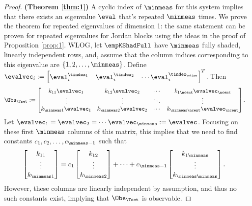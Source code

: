 \begin{proof}
\textbf{(Theorem \ref{thm:1})}
A cyclic index of $\minmeas$ for this system implies that there exists an eigenvalue $\eval$ that's repeated $\minmeas$ times. We prove the theorem for repeated eigenvalues of dimension 1: the same statement can be proven for repeated eigenvalues for Jordan blocks using the ideas in the proof of Proposition \ref{prop:1}. 
WLOG, let $\empKShadFull$ have $\minmeas$ fully shaded, linearly independent rows, and, assume that the column indices corresponding to this eigenvalue are $\{1,2,\dots,\minmeas\}$. Define 
$\evalvec_i:= \begin{bmatrix}\eval_i^{\tindex_1} & \eval_i^{\tindex_2} & \cdots \eval_i^{\tindex_{\otime}}\end{bmatrix}^T$. Then
	\begin{align*}
	\Obs_{\Tset}
	&:= 
	\begin{bmatrix}
	k_{11} \evalvec_1 & k_{12} \evalvec_2 & \cdots & k_{1\ncent} \evalvec_{\ncent}\\
	\vdots & \vdots & \ddots & \vdots\\
	k_{\minmeas 1} \evalvec_1 & k_{\minmeas 2} \evalvec_2 & \cdots & k_{\minmeas \ncent} \evalvec_{\ncent}
	\end{bmatrix}.
	\end{align*}
	Let $\evalvec_1 = \evalvec_2 = \cdots \evalvec_{\minmeas} := \evalvec$. 
	Focusing on these first $\minmeas$ columns of this matrix, this implies that
	we need to find constants $c_1,c_2,\dots, c_{\minmeas-1}$ such that
	\begin{align*}
	\begin{bmatrix}
	k_{11}\\
	\vdots\\
	k_{\minmeas 1}
	\end{bmatrix}
	&= 
	c_1 
	\begin{bmatrix}
	k_{12}\\
	\vdots\\
	k_{\minmeas 2}
	\end{bmatrix}
	+ \cdots + 
	c_{\minmeas-1} 
	\begin{bmatrix}
	k_{1\minmeas}\\   
	\vdots\\
	k_{\minmeas \minmeas} 
	\end{bmatrix}.
	\end{align*}
	However, these columns are linearly independent by assumption, and thus no such constants exist, implying that $\Obs_{\Tset}$ is observable. 
\end{proof}


